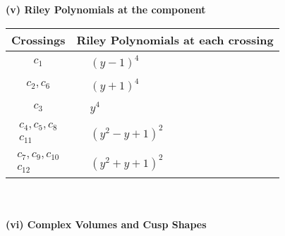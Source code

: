 \documentclass[1p]{elsarticle_modified}
\theoremstyle{definition}
\begin{document}
\newpage\renewcommand{\arraystretch}{1}
\flushleft \textbf{(v) Riley Polynomials at the component}\newline \\
\begin{tabular}{m{50pt}|m{274pt}}
Crossings & \hspace{64pt}Riley Polynomials at each crossing \\
\hline $$\begin{aligned}c_{1}\end{aligned}$$&$\begin{aligned}
&(y-1)^4
\end{aligned}$\\
\hline $$\begin{aligned}c_{2},c_{6}\end{aligned}$$&$\begin{aligned}
&(y+1)^4
\end{aligned}$\\
\hline $$\begin{aligned}c_{3}\end{aligned}$$&$\begin{aligned}
&y^4
\end{aligned}$\\
\hline $$\begin{aligned}c_{4},c_{5},c_{8}\\c_{11}\end{aligned}$$&$\begin{aligned}
&(y^2- y+1)^2
\end{aligned}$\\
\hline $$\begin{aligned}c_{7},c_{9},c_{10}\\c_{12}\end{aligned}$$&$\begin{aligned}
&(y^2+y+1)^2
\end{aligned}$\\
\hline
\end{tabular}\\~\\
\newpage\flushleft \textbf{(vi) Complex Volumes and Cusp Shapes}
\end{document}
